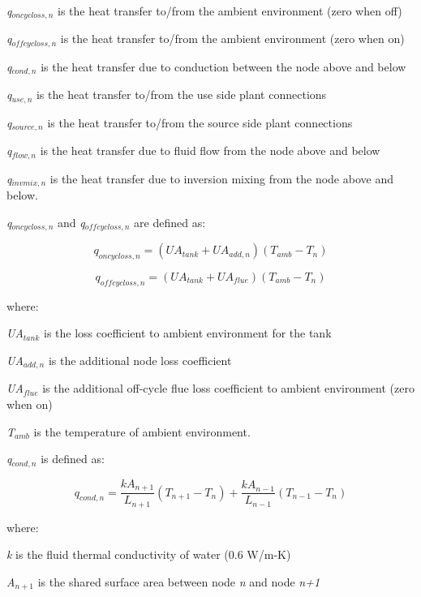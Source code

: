 \emph{q\(_{oncycloss,n}\)} is the heat transfer to/from the ambient environment (zero when off)

\emph{q\(_{offcycloss,n}\)} is the heat transfer to/from the ambient environment (zero when on)

\emph{q\(_{cond,n}\)} is the heat transfer due to conduction between the node above and below

\emph{q\(_{use,n}\)} is the heat transfer to/from the use side plant connections

\emph{q\(_{source,n}\)} is the heat transfer to/from the source side plant connections

\emph{q\(_{flow,n}\)} is the heat transfer due to fluid flow from the node above and below

\emph{q\(_{invmix,n}\)} is the heat transfer due to inversion mixing from the node above and below.

\emph{q\(_{oncycloss,n}\)} and \emph{q\(_{offcycloss,n}\)} are defined as:

\begin{equation}
{q_{oncycloss,n}} = ({UA_{tank}} + {UA_{add,n}})({T_{amb}} - {T_n})
\end{equation}

\begin{equation}
{q_{offcycloss,n}} = ({UA_{tank} + UA_{flue}})({T_{amb}} - {T_n})
\end{equation}

where:

\emph{UA\(_{tank}\)} is the loss coefficient to ambient environment for the tank

\emph{UA\(_{add,n}\)} is the additional node loss coefficient

\emph{UA\(_{flue}\)} is the additional off-cycle flue loss coefficient to ambient environment (zero when on)

\emph{T\(_{amb}\)} is the temperature of ambient environment.

\emph{q\(_{cond,n}\)} is defined as:

\begin{equation}
{q_{cond,n}} = \frac{{k{A_{n + 1}}}}{{{L_{n + 1}}}}({T_{n + 1}} - {T_n}) + \frac{{k{A_{n - 1}}}}{{{L_{n - 1}}}}({T_{n - 1}} - {T_n})
\end{equation}

where:

\emph{k} is the fluid thermal conductivity of water (0.6 W/m-K)

\emph{A\(_{n+1}\)} is the shared surface area between node \emph{n} and node \emph{n+1}

